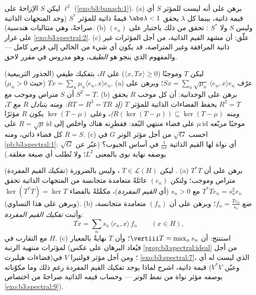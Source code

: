 \begin{exercise}[$\star\star\star$]\label{exo:b3:spectral:10}
ليكن $S$ الإزاحةَ على $\ell^2$ (\cref{exo:b3:banach:1}).
(a) برهن على أنه ليست للمؤثر $S$ أي قيمة ذاتية، بينما كل
$\lambda$ يحقق $\abs\lambda < 1$ قيمةٌ ذاتية للمؤثر $S^*$ (وجد المتجهات
الذاتية صراحةً، وهي متتاليات هندسية).
(b) وليس $S$ ولا $S^*$ : تحقق من ذلك باختبار على
$(e_n)$ على غرار \cref{exo:b3:spectral:2}.
(c) علّق: أن مشهد القيم الذاتية، من أجل المؤثرات غير ذاتية
المرافقة وغير المتراصة، قد يكون أي شيء من الخالي إلى قرص كامل
--- والمفهوم الذي ينجو هو \emph{الطيف}، وهو مدروس في مقرر
لاحق.
\end{exercise}

\begin{exercise}[$\star\star$]\label{exo:b3:spectral:11}
(الجذور التربيعية) ليكن $T$   وموجبًا
($\langle x, Tx\rangle \geq 0$) على  $H$، بتفكيك طيفي $Tx = \sum_n\mu_n\langle e_n,
x\rangle e_n$ (حيث
$\mu_n > 0$).
(a) عرّف $Sx = \sum_n\sqrt{\mu_n}\,\langle e_n, x\rangle
e_n$؛ وبرهن على أن $S$ متراص  وموجب
مع $S^2
= T$.
(b) برهن على الوحدانية: أن كل  موجب  $R$
يحقق $R^2 = T$ يحفظ الفضاءات الذاتية للمؤثر $T$
\emph{(إذ $RT = R^3 = TR$: ومنه يتبادل $R$ مع $T$، ومنه
$R(\ker(T - \mu)) \subseteq \ker(T - \mu)$)}، وعلى $\ker(T - \mu)$ يكون $R$ مؤثرًا موجبًا مربّعه
$\mu\,\mathrm{id}$ على فضاء منتهي البُعد: فقطرِنه هناك واخلص إلى $R =
\sqrt\mu\,\mathrm{id}$
على كل فضاء ذاتي، ومنه $R = S$.
(c) احسب $\sqrt G$ من أجل مؤثر الوتر $G$ في \cref{pb:b3:spectral:1}: أي نواة
لها القيم الذاتية $\frac1{n\pi}$ في أساس الجيوب؟ (عبّر عن
$\sqrt G$ بوصفه نهاية نوى بالمعنى $L^2$؛ ولا تُطلب أي صيغة
مغلقة.)
\end{exercise}

\begin{exercise}[$\star\star\star$]\label{exo:b3:spectral:12}
(تفكيك القيم المفردة) ليكن $T \in \mathcal L(H)$ \emph{}، وليس بالضرورة
.
(a) برهن على أن $T^*T$ متراص  وموجب؛ ولتكن
$(e_n)$ عائلةً متعامدة متجانسة من المتجهات الذاتية تحقق
$T^*Te_n = s_n^2e_n$ مع $s_n > 0$ (أي \emph{القيم المفردة})، مكمَّلةً
بالفضاء $\ker(T^*T) = \ker T$ (وبرهن على هذا التساوي).
(b) ضع $f_n = \frac{Te_n}{s_n}$؛ وبرهن على أن $(f_n)$ متعامدة متجانسة، وأثبت
\emph{تفكيك القيم المفردة}:
\[
Tx = \sum_n s_n\,\langle e_n, x\rangle\,f_n
\qquad (x \in H),
\]
مع التقارب في $H$.
(c) استنتج: أن $\vertiii T = \max_ns_n$؛ وأن $T$ نهايةٌ بالمعيار لمؤثرات منتهية
الرتبة (فيُعاد البرهان على عكس \cref{prop:b3:spectral:ideal} من أجل فضاءات
هيلبرت)؛ ومن أجل مؤثر فولتيرا $V$ في \cref{exo:b3:spectral:7}، الذي ليست له
أي قيمة ذاتية، اشرح لماذا يوجد تفكيك القيم المفردة رغم ذلك وما
مكوّناته (وعيّن $V^*V$ بوصفه مؤثر نواة من نمط الوتر --- وحساب
قيمه الذاتية صراحةً من اختصاص \cref{exo:b3:spectral:9}).
\end{exercise}

